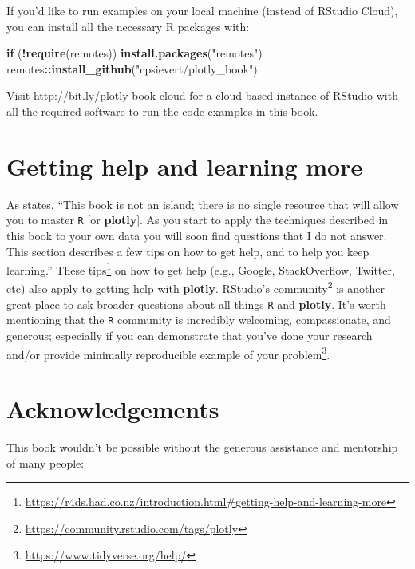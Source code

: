 \documentclass[
  12pt,
]{krantz}
\newenvironment{Shaded}{\begin{snugshade}}{\end{snugshade}}
\newcommand{\ControlFlowTok}[1]{\textcolor[rgb]{0.13,0.29,0.53}{\textbf{#1}}}
\newcommand{\KeywordTok}[1]{\textcolor[rgb]{0.13,0.29,0.53}{\textbf{#1}}}
\newcommand{\NormalTok}[1]{#1}
\newcommand{\OperatorTok}[1]{\textcolor[rgb]{0.81,0.36,0.00}{\textbf{#1}}}
\newcommand{\StringTok}[1]{\textcolor[rgb]{0.31,0.60,0.02}{#1}}
\renewcommand{\href}[2]{#2\footnote{\url{#1}}}
\begin{document}
If you'd like to run examples on your local machine (instead of RStudio Cloud), you can install all the necessary R packages with:

\begin{Shaded}
\begin{Highlighting}[]
\ControlFlowTok{if}\NormalTok{ (}\OperatorTok{!}\KeywordTok{require}\NormalTok{(remotes)) }\KeywordTok{install.packages}\NormalTok{(}\StringTok{"remotes"}\NormalTok{)}
\NormalTok{remotes}\OperatorTok{::}\KeywordTok{install_github}\NormalTok{(}\StringTok{"cpsievert/plotly_book"}\NormalTok{)}
\end{Highlighting}
\end{Shaded}

Visit \url{http://bit.ly/plotly-book-cloud} for a cloud-based instance of RStudio with all the required software to run the code examples in this book.

\hypertarget{getting-help-and-learning-more}{%
\section{Getting help and learning more}\label{getting-help-and-learning-more}}

As \citet{r4ds} states, ``This book is not an island; there is no single resource that will allow you to master \texttt{R} {[}or \textbf{plotly}{]}. As you start to apply the techniques described in this book to your own data you will soon find questions that I do not answer. This section describes a few tips on how to get help, and to help you keep learning.'' \href{https://r4ds.had.co.nz/introduction.html\#getting-help-and-learning-more}{These tips} on how to get help (e.g., Google, StackOverflow, Twitter, etc) also apply to getting help with \textbf{plotly}. \href{https://community.rstudio.com/tags/plotly}{RStudio's community} is another great place to ask broader questions about all things \texttt{R} and \textbf{plotly}. It's worth mentioning that the \texttt{R} community is incredibly welcoming, compassionate, and generous; especially if you can demonstrate that you've done your research and/or \href{https://www.tidyverse.org/help/}{provide minimally reproducible example of your problem}.

\hypertarget{acknowledgements}{%
\section{Acknowledgements}\label{acknowledgements}}

This book wouldn't be possible without the generous assistance and mentorship of many people:
\end{document}
